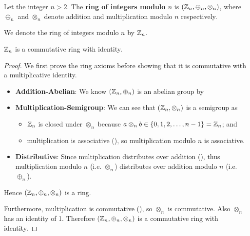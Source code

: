 \begin{definition}
    Let the integer $n > 2$. The \textbf{ring of integers modulo $n$} is $(\mathbb{Z}_n, \oplus_n, \otimes_n)$, where $\oplus_n$ and $\otimes_n$ denote addition and multiplication modulo $n$ respectively.
\end{definition}
\begin{remark}
    We denote the ring of integers modulo $n$ by $\mathbb{Z}_n$.
\end{remark}
\begin{proposition}
    $\mathbb{Z}_n$ is a commutative ring with identity.
\end{proposition}
\begin{proof}
    We first prove the ring axioms before showing that it is commutative with a multiplicative identity.
    \begin{itemize}
        \item \textbf{Addition-Abelian}: We know $(\mathbb{Z}_n, \oplus_n)$ is an abelian group by 
        \item \textbf{Multiplication-Semigroup}: We can see that $(\mathbb{Z}_n, \otimes_n)$ is a semigroup as
        \begin{itemize}
            \item $\mathbb{Z}_n$ is closed under $\otimes_n$ because $a \otimes_n b \in \{0, 1, 2, \dots, n-1\} = \mathbb{Z}_n$; and
            \item multiplication is associative (), so multiplication modulo $n$ is associative.
        \end{itemize}
        \item \textbf{Distributive}: Since multiplication distributes over addition (), thus multiplication modulo $n$ (i.e. $\otimes_n$) distributes over addition modulo $n$ (i.e. $\oplus_n$).
    \end{itemize}
    Hence $(\mathbb{Z}_n, \oplus_n, \otimes_n)$ is a ring.
    
    Furthermore, multiplication is commutative (), so $\otimes_n$ is commutative. Also $\otimes_n$ has an identity of 1. Therefore $(\mathbb{Z}_n, \oplus_n, \otimes_n)$ is a commutative ring with identity.
\end{proof}


